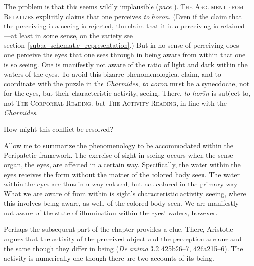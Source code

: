 The problem is that this seems wildly implausible (\emph{pace} \citealt{Trubowitz:2025aa}). \textsc{The Argument from Relatives} explicitly claims that one perceives \emph{to horōn}. (Even if the claim that the perceiving is a seeing is rejected, the claim that it is a perceiving is retained—at least in some sense, on the variety see section~\ref{sub:a_schematic_representation}.) But in no sense of perceiving does one perceive the eyes that one sees through in being aware from within that one is so seeing. One is manifestly not aware of the ratio of light and dark within the waters of the eyes. To avoid this bizarre phenomenological claim, and to coordinate with the puzzle in the \emph{Charmides}, \emph{to horōn} must be a synecdoche, not for the eyes, but their characteristic activity, seeing. There, \emph{to horōn} is subject to, not \textsc{The Corporeal Reading}. but \textsc{The Activity Reading}, in line with the \emph{Charmides}. 

How might this conflict be resolved?

Allow me to summarize the phenomenology to be accommodated within the Peripatetic framework. The exercise of sight in seeing occurs when the sense organ, the eyes, are affected in a certain way. Specifically, the water within the eyes receives the form without the matter of the colored body seen. The water within the eyes are thus in a way colored, but not colored in the primary way. What we are aware of from within is sight's characteristic activity, seeing, where this involves being aware, as well, of the colored body seen. We are manifestly not aware of the state of illumination within the eyes' waters, however. 

Perhaps the subsequent part of the chapter provides a clue. There, Aristotle argues that the activity of the perceived object and the perception are one and the same though they differ in being (\emph{De anima} 3.2 425b26–7, 426a215–6). The activity is numerically one though there are two accounts of its being.


